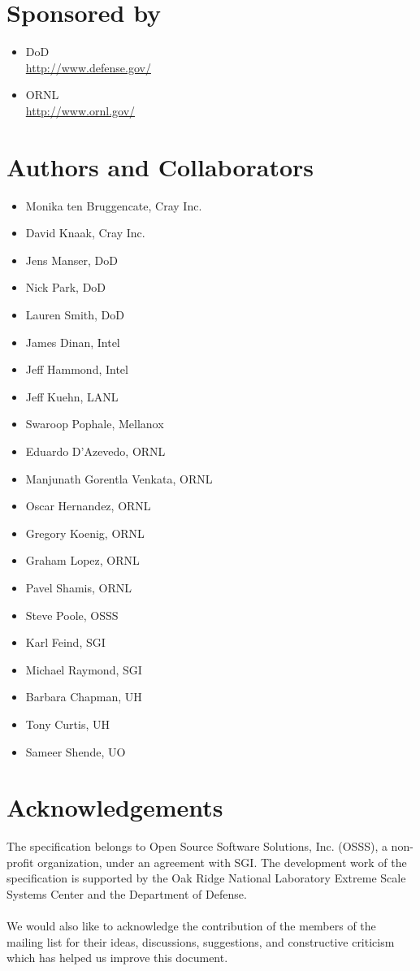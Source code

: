 \section*{Sponsored by}
\begin{itemize}
\item \ac{DoD}\\
  \url{http://www.defense.gov/ }
\item \ac{ORNL}\\
  \url{http://www.ornl.gov/} 
\end{itemize}

\section*{Authors and Collaborators}
\begin{itemize}
\item Monika ten Bruggencate, Cray Inc.
\item David Knaak, Cray Inc.
\item Jens Manser, \ac{DoD}
\item Nick Park, \ac{DoD}
\item Lauren Smith, \ac{DoD}
\item James Dinan, Intel
\item Jeff Hammond, Intel
\item Jeff Kuehn, \ac{LANL}
\item Swaroop Pophale, Mellanox
\item Eduardo D'Azevedo, \ac{ORNL}
\item Manjunath Gorentla Venkata, \ac{ORNL}
\item Oscar Hernandez, \ac{ORNL}
\item Gregory Koenig, \ac{ORNL}
\item Graham Lopez, \ac{ORNL}
\item Pavel Shamis, \ac{ORNL}
\item Steve Poole, OSSS
\item Karl Feind, SGI
\item Michael Raymond, SGI
\item Barbara Chapman, \ac{UH} 
\item Tony Curtis, \ac{UH}
\item Sameer Shende, \ac{UO}
\end{itemize}

\date{\today}

\section*{Acknowledgements}
The \openshmem specification belongs to Open Source Software Solutions, Inc.
(OSSS), a non-profit organization, under an agreement with SGI. The development
work of the specification is supported by the Oak Ridge National Laboratory
Extreme Scale Systems Center and the Department of Defense.\\
\\
We would also like to acknowledge the contribution of the members of the
\openshmem mailing list for their ideas, discussions, suggestions, and
constructive criticism which has helped us improve this document.


